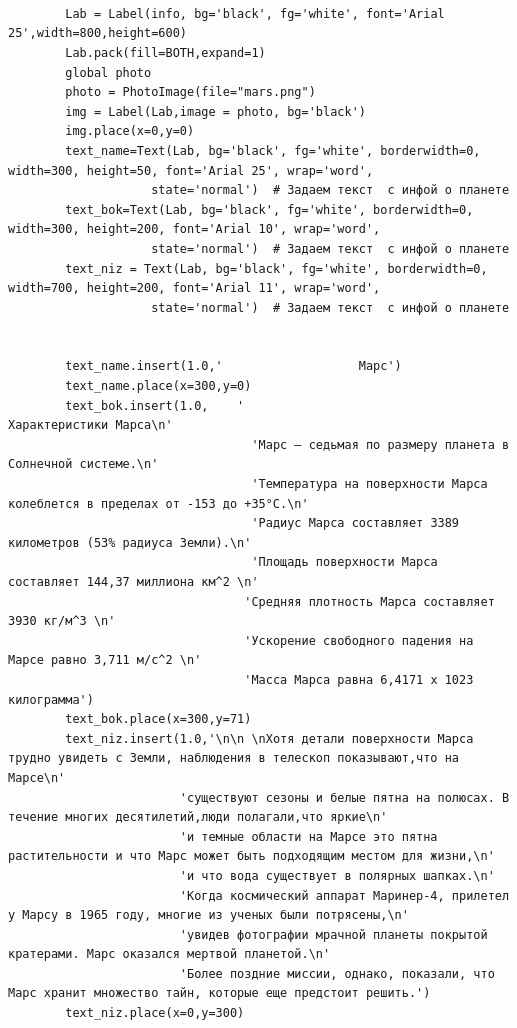 \documentclass[11pt,a4paper]{report}
\begin{document}
\begin{verbatim}
        
        
    
        Lab = Label(info, bg='black', fg='white', font='Arial 25',width=800,height=600)  
        Lab.pack(fill=BOTH,expand=1)
        global photo
        photo = PhotoImage(file="mars.png")
        img = Label(Lab,image = photo, bg='black')
        img.place(x=0,y=0)
        text_name=Text(Lab, bg='black', fg='white', borderwidth=0, width=300, height=50, font='Arial 25', wrap='word',
                    state='normal')  # Задаем текст  с инфой о планете
        text_bok=Text(Lab, bg='black', fg='white', borderwidth=0, width=300, height=200, font='Arial 10', wrap='word',
                    state='normal')  # Задаем текст  с инфой о планете
        text_niz = Text(Lab, bg='black', fg='white', borderwidth=0, width=700, height=200, font='Arial 11', wrap='word',
                    state='normal')  # Задаем текст  с инфой о планете
    
       
        text_name.insert(1.0,'                   Марс')
        text_name.place(x=300,y=0)
        text_bok.insert(1.0,    '                                           Характеристики Марса\n' 
                                  'Марс – седьмая по размеру планета в Солнечной системе.\n'
                                  'Температура на поверхности Марса колеблется в пределах от -153 до +35°C.\n'
                                  'Радиус Марса составляет 3389 километров (53% радиуса Земли).\n'
                                  'Площадь поверхности Марса составляет 144,37 миллиона км^2 \n'
                                 'Средняя плотность Марса составляет 3930 кг/м^3 \n'                              
                                 'Ускорение свободного падения на Марсе равно 3,711 м/c^2 \n'
                                 'Масса Марса равна 6,4171 х 1023 килограмма')
        text_bok.place(x=300,y=71)        
        text_niz.insert(1.0,'\n\n \nХотя детали поверхности Марса трудно увидеть с Земли, наблюдения в телескоп показывают,что на Марсе\n'
                        'существуют сезоны и белые пятна на полюсах. В течение многих десятилетий,люди полагали,что яркие\n'
                        'и темные области на Марсе это пятна растительности и что Марс может быть подходящим местом для жизни,\n'
                        'и что вода существует в полярных шапках.\n'
                        'Когда космический аппарат Маринер-4, прилетел у Марсу в 1965 году, многие из ученых были потрясены,\n'
                        'увидев фотографии мрачной планеты покрытой кратерами. Марс оказался мертвой планетой.\n'
                        'Более поздние миссии, однако, показали, что Марс хранит множество тайн, которые еще предстоит решить.')
        text_niz.place(x=0,y=300)


\end{verbatim}
\end{document}
